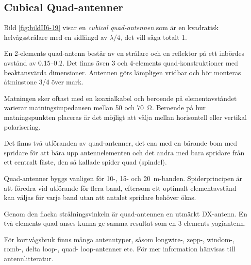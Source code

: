 \subsection{Cubical Quad-antenner}


Bild \ref{fig:bildII6-19} visar en \emph{cubical quad-antennen} som är en
kvadratisk helvågsstrålare med en sidlängd av \(\lambda/4\), det vill säga
totalt \SI{1}{\lambda}.

En 2-elements quad-antenn består av en strålare och en reflektor på ett inbördes
avstånd av \SIrange{0,15}{0,2}{\lambda}.
Det finns även 3 och 4-elements quad-konstruktioner med beaktansvärda
dimensioner.
Antennen görs lämpligen vridbar och bör monteras åtminstone \SI{3/4}{\lambda}
över mark.

Matningen sker oftast med en koaxialkabel och beroende på elementavståndet
varierar matningsimpedansen mellan 50 och \SI{70}{\ohm}.
Beroende på hur matningspunkten placeras är det möjligt att välja mellan
horisontell eller vertikal polarisering.

Det finns två utföranden av quad-antenner, det ena med en bärande bom
med spridare för att bära upp antennelementen och det andra med bara
spridare från ett centralt fäste, den så kallade spider quad (spindel).

Quad-antenner byggs vanligen för 10-, 15- och \SI{20}{\metre}-banden.
Spiderprincipen är att föredra vid utförande för flera band, eftersom ett
optimalt element\-avstånd kan väljas för varje band utan att antalet spridare
behöver ökas.

Genom den flacka strålningsvinkeln är quad-\-an\-tennen en utmärkt DX-antenn.
En två-elements quad anses kunna ge samma resultat som en 3-elements yagiantenn.

För kortvågsbruk finns många antenntyper, såsom longwire-, zepp-,
windom-, romb-, delta loop-, quad- loop-antenner etc.
För mer information hänvisas till antennlitteratur.
